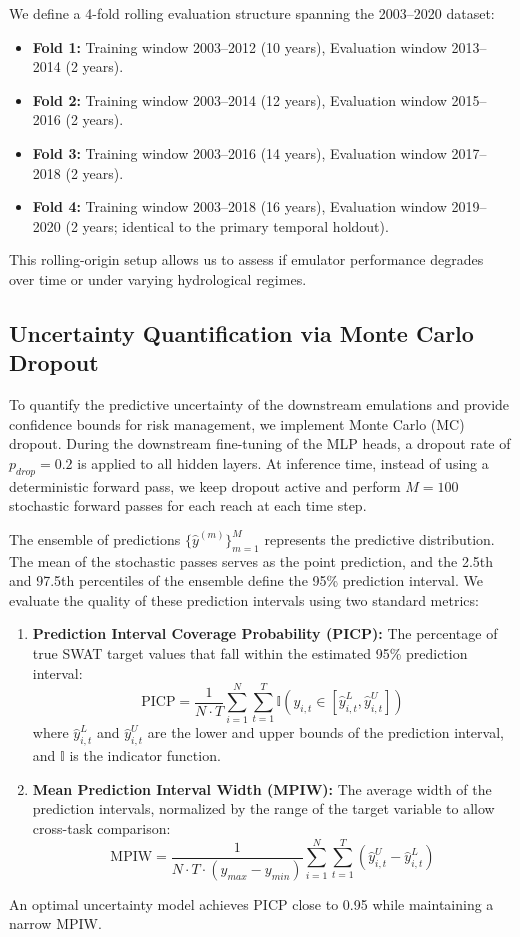 \documentclass[preprint,12pt]{elsarticle}
\begin{document}
We define a 4-fold rolling evaluation structure spanning the 2003--2020 dataset:
\begin{itemize}
    \item \textbf{Fold 1:} Training window 2003--2012 (10 years), Evaluation window 2013--2014 (2 years).
    \item \textbf{Fold 2:} Training window 2003--2014 (12 years), Evaluation window 2015--2016 (2 years).
    \item \textbf{Fold 3:} Training window 2003--2016 (14 years), Evaluation window 2017--2018 (2 years).
    \item \textbf{Fold 4:} Training window 2003--2018 (16 years), Evaluation window 2019--2020 (2 years; identical to the primary temporal holdout).
\end{itemize}
This rolling-origin setup allows us to assess if emulator performance degrades over time or under varying hydrological regimes.

\subsection{Uncertainty Quantification via Monte Carlo Dropout}
To quantify the predictive uncertainty of the downstream emulations and provide confidence bounds for risk management, we implement Monte Carlo (MC) dropout. During the downstream fine-tuning of the MLP heads, a dropout rate of $p_{drop} = 0.2$ is applied to all hidden layers. At inference time, instead of using a deterministic forward pass, we keep dropout active and perform $M = 100$ stochastic forward passes for each reach at each time step. 

The ensemble of predictions $\{\hat{y}^{(m)}\}_{m=1}^M$ represents the predictive distribution. The mean of the stochastic passes serves as the point prediction, and the 2.5th and 97.5th percentiles of the ensemble define the 95\% prediction interval. We evaluate the quality of these prediction intervals using two standard metrics:
\begin{enumerate}
    \item \textbf{Prediction Interval Coverage Probability (PICP):} The percentage of true SWAT target values that fall within the estimated 95\% prediction interval:
    \begin{equation}
        \text{PICP} = \frac{1}{N \cdot T} \sum_{i=1}^N \sum_{t=1}^T \mathbb{I}\left( y_{i,t} \in [\hat{y}_{i,t}^{L}, \hat{y}_{i,t}^{U}] \right)
    \end{equation}
    where $\hat{y}_{i,t}^{L}$ and $\hat{y}_{i,t}^{U}$ are the lower and upper bounds of the prediction interval, and $\mathbb{I}$ is the indicator function.
    \item \textbf{Mean Prediction Interval Width (MPIW):} The average width of the prediction intervals, normalized by the range of the target variable to allow cross-task comparison:
    \begin{equation}
        \text{MPIW} = \frac{1}{N \cdot T \cdot (y_{max} - y_{min})} \sum_{i=1}^N \sum_{t=1}^T \left( \hat{y}_{i,t}^{U} - \hat{y}_{i,t}^{L} \right)
    \end{equation}
\end{enumerate}
An optimal uncertainty model achieves PICP close to 0.95 while maintaining a narrow MPIW.
\end{document}
